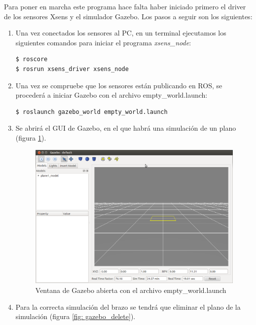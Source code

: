 \documentclass[12pt, a4paper]{report}
\begin{document}
Para poner en marcha este programa hace falta haber iniciado primero el driver de los sensores Xsens y el simulador Gazebo. Los pasos a seguir son los siguientes:

\begin{enumerate}
\item Una vez conectados los sensores al PC, en un terminal ejecutamos los siguientes comandos para iniciar el programa \textit{xsens\_node}:

\begin{verbatim}
$ roscore
$ rosrun xsens_driver xsens_node
\end{verbatim}

\item Una vez se compruebe que los sensores están publicando en ROS, se procederá a iniciar Gazebo con el archivo empty\_world.launch:

\begin{verbatim}
$ roslaunch gazebo_world empty_world.launch
\end{verbatim}

\item Se abrirá el GUI de Gazebo, en el que habrá una simulación de un plano (figura \ref{fig: gazebo_empty}). 


\begin{figure}
	\centering
		\includegraphics[scale=0.4]{../img/gazebo_empty.png} 
	\caption[Ventana de Gazebo abierta con el archivo empty\_world.launch]{Ventana de Gazebo abierta con el archivo empty\_world.launch} 
	\label{fig: gazebo_empty}
\end{figure}

\item Para la correcta simulación del brazo se tendrá que eliminar el plano de la simulación (figura \ref{fig: gazebo_delete}).


\end{enumerate}
\end{document}
